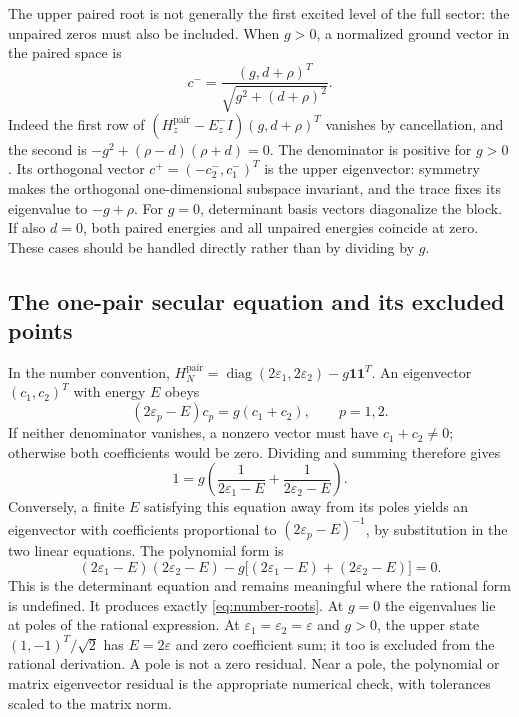 \documentclass[11pt,a4paper]{article}
\theoremstyle{plain}
\theoremstyle{definition}
\theoremstyle{remark}
\begin{document}
The upper paired root is not generally the first excited level of the full
sector: the unpaired zeros must also be included. When $g>0$, a normalized
ground vector in the paired space is
\[
 c^- =\frac{(g,d+\rho)^T}{\sqrt{g^2+(d+\rho)^2}}.
\]
Indeed the first row of
$(H_z^{\mathrm{pair}}-E_z^-I)(g,d+\rho)^T$ vanishes by cancellation,
and the second is $-g^2+(\rho-d)(\rho+d)=0$.
The denominator is positive for $g>0$. Its orthogonal vector
$c^+=(-c^-_2,c^-_1)^T$ is the upper eigenvector: symmetry makes the
orthogonal one-dimensional subspace invariant, and the trace fixes its
eigenvalue to $-g+\rho$. For $g=0$, determinant basis vectors diagonalize
the block. If also $d=0$, both paired energies and all unpaired energies
coincide at zero. These cases should be handled directly rather than by
dividing by $g$.

\subsection{The one-pair secular equation and its excluded points}
In the number convention,
$H_N^{\mathrm{pair}}=\operatorname{diag}(2\varepsilon_1,
2\varepsilon_2)-g\boldsymbol 1\boldsymbol 1^T$.
An eigenvector $(c_1,c_2)^T$ with energy $E$ obeys
\[
 (2\varepsilon_p-E)c_p=g(c_1+c_2),\qquad p=1,2.
\]
If neither denominator vanishes, a nonzero vector must have
$c_1+c_2\ne0$; otherwise both coefficients would be zero. Dividing and
summing therefore gives
\begin{equation}
 1=g\left(\frac{1}{2\varepsilon_1-E}
          +\frac{1}{2\varepsilon_2-E}\right).
 \label{eq:richardson}
\end{equation}
Conversely, a finite $E$ satisfying this equation away from its poles yields
an eigenvector with coefficients proportional to
$(2\varepsilon_p-E)^{-1}$, by substitution in the two linear equations.
The polynomial form is
\begin{equation}
 (2\varepsilon_1-E)(2\varepsilon_2-E)
 -g\bigl[(2\varepsilon_1-E)+(2\varepsilon_2-E)\bigr]=0.
 \label{eq:pair-polynomial}
\end{equation}
This is the determinant equation and remains meaningful where the rational
form is undefined. It produces exactly \eqref{eq:number-roots}.
At $g=0$ the eigenvalues lie at poles of the rational expression. At
$\varepsilon_1=\varepsilon_2=\varepsilon$ and $g>0$, the upper state
$(1,-1)^T/\sqrt2$ has $E=2\varepsilon$ and zero coefficient sum;
it too is excluded from the rational derivation. A pole is not a zero
residual. Near a pole, the polynomial or matrix eigenvector residual is the
appropriate numerical check, with tolerances scaled to the matrix norm.
\end{document}
